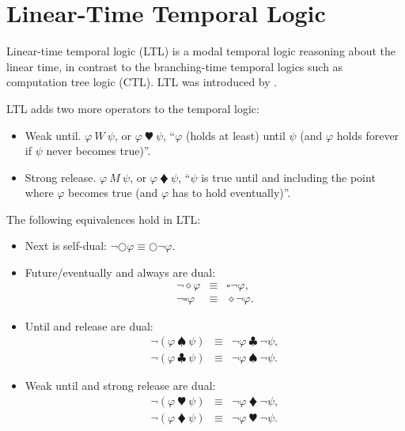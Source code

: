 \section{Linear-Time Temporal Logic}

Linear-time temporal logic (LTL) is a modal temporal logic reasoning about the linear time, in contrast to the branching-time temporal logics such as computation tree logic (CTL). LTL was introduced by \cite{DBLP:conf/focs/Pnueli77}.

LTL adds two more operators to the temporal logic:
\begin{itemize}
    \item Weak until. $\varphi~W~\psi$, or $\varphi~\varheartsuit~\psi$, ``$\varphi$ (holds at least) until $\psi$ (and $\varphi$ holds forever if $\psi$ never becomes true)''.
    \item Strong release. $\varphi~M~\psi$, or $\varphi~\vardiamondsuit~\psi$, ``$\psi$ is true until and including the point where $\varphi$ becomes true (and $\varphi$ has to hold eventually)''.
\end{itemize}

The following equivalences hold in LTL:
\begin{itemize}
    \item Next is self-dual: $\neg\bigcirc\varphi \equiv \bigcirc\neg\varphi$.
    \item Future/eventually and always are dual:
    \begin{eqnarray*}
    \neg\diamond\varphi &\equiv& \square\neg\varphi, \\
    \neg\square\varphi &\equiv& \diamond\neg\varphi.
    \end{eqnarray*}
    \item Until and release are dual: 
    \begin{eqnarray*}
    \neg(\varphi~\spadesuit~\psi) &\equiv& \neg\varphi~\clubsuit~\neg\psi, \\
    \neg(\varphi~\clubsuit~\psi) &\equiv& \neg\varphi~\spadesuit~\neg\psi.
    \end{eqnarray*}
    \item Weak until and strong release are dual: 
    \begin{eqnarray*}
    \neg(\varphi~\varheartsuit~\psi) &\equiv& \neg\varphi~\vardiamondsuit~\neg\psi, \\
    \neg(\varphi~\vardiamondsuit~\psi) &\equiv& \neg\varphi~\varheartsuit~\neg\psi.
    \end{eqnarray*}
\end{itemize}

